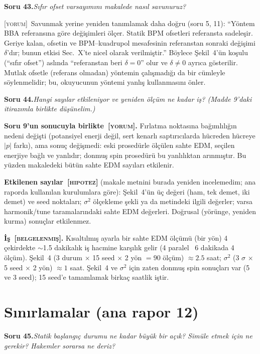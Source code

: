 \documentclass[11pt,a4paper]{article}
\newcommand{\BEL}{\textsc{[belgelenmiş]}}
\newcommand{\YOR}{\textsc{[yorum]}}
\newcommand{\HIP}{\textsc{[hipotez]}}
\newcounter{soru}
\newcommand{\soru}[2]{%
  \par\medskip\noindent\textbf{Soru #1.}\enspace\textit{#2}\par\nopagebreak\smallskip}
\begin{document}
\soru{43}{Sıfır ofset varsayımını makalede nasıl savunuruz?}

\YOR~Savunmak yerine yeniden tanımlamak daha doğru (soru 5, 11): ``Yöntem BBA referansına göre değişimleri
ölçer. Statik BPM ofsetleri referansta sadeleşir. Geriye kalan, ofsetin ve BPM--kuadrupol mesafesinin
referanstan sonraki değişimi $\delta$'dır; bunun etkisi Sec.~X'te nicel olarak verilmiştir.'' Böylece
Şekil~4'ün koşulu (``sıfır ofset'') aslında ``referanstan beri $\delta=0$'' olur ve $\delta\ne0$ ayrıca
gösterilir. Mutlak ofsetle (referans olmadan) yöntemin çalışmadığı da bir cümleyle söylenmelidir; bu,
okuyucunun yöntemi yanlış kullanmasını önler.

\soru{44}{Hangi sayılar etkileniyor ve yeniden ölçüm ne kadar iş? (Madde 9'daki itirazımla birlikte
düşünelim.)}

\textbf{Soru 9'un sonucuyla birlikte~\YOR.} Fırlatma noktasına bağımlılığın nedeni değişti (potansiyel
enerji değil, sert kenarlı saptırıcılarda hücreden hücreye $|p|$ farkı), ama sonuç değişmedi: eski
prosedürle ölçülen sahte EDM, seçilen enerjiye bağlı ve yanlıdır; donmuş spin prosedürü bu yanlılıktan
arınmıştır. Bu yüzden makaledeki bütün sahte EDM sayıları etkilenir.

\textbf{Etkilenen sayılar~\HIP} (makale metnini burada yeniden incelemedim; ana raporda kullanılan kurulumlara
göre): Şekil~4'ün üç değeri (ham, tek demet, iki demet) ve seed noktaları; $\sigma^2$ ölçekleme şekli ya da
metindeki ilgili değerler; varsa harmonik/tune taramalarındaki sahte EDM değerleri. Doğrusal (yörünge,
yeniden kurma) sonuçlar etkilenmez.

\textbf{İş~\BEL.} Kısaltılmış ayarla bir sahte EDM ölçümü (bir yön) 4 çekirdekte $\sim$1.5 dakikalık iş
hacmine karşılık gelir (4 paralel ~6 dakikada 4 ölçüm). Şekil~4 (3 durum $\times$ 15 seed $\times$ 2 yön
$=90$ ölçüm) $\approx2.5$ saat; $\sigma^2$ (3 $\sigma$ $\times$ 5 seed $\times$ 2 yön) $\approx1$ saat. Şekil~4
ve $\sigma^2$ için zaten donmuş spin sonuçları var (5 ve 3 seed); 15 seed'e tamamlamak birkaç saatlik iştir.

\section{Sınırlamalar (ana rapor 12)}

\soru{45}{Statik başlangıç durumu ne kadar büyük bir açık? Simüle etmek için ne gerekir? Hakemler sorarsa
ne deriz?}
\end{document}
